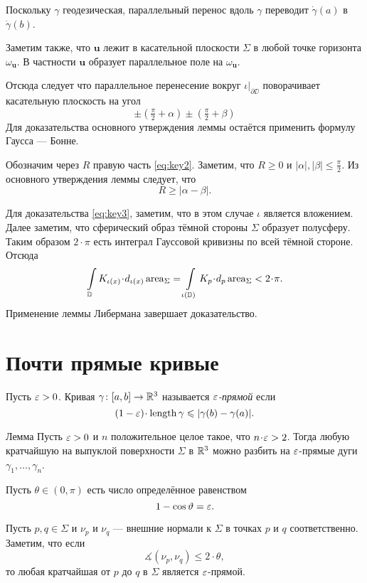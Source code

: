 \documentclass[a4paper,10pt]{article}
\begin{document}
Поскольку $\gamma$ геодезическая, 
параллельный перенос вдоль $\gamma$ 
переводит $\dot\gamma(a)$ в $\dot\gamma(b)$.

Заметим также, что $\bm{u}$ лежит в касательной плоскости $\Sigma$ в любой точке горизонта $\omega_{\bm{u}}$.
В частности $\bm{u}$ образует параллельное поле на $\omega_{\bm{u}}$.

Отсюда следует что параллельное перенесение вокруг $\iota|_{\partial\DD}$ 
поворачивает касательную плоскость на угол 
\[\pm(\tfrac\pi2+\alpha)\pm(\tfrac\pi2+\beta)\]
Для доказательства основного утверждения леммы остаётся применить формулу Гаусса --- Бонне.

Обозначим через $R$ правую часть \ref{eq:key2}.
Заметим, что $R\ge 0$ 
и $|\alpha|,|\beta|\le \tfrac\pi2$.
Из основного утверждения леммы следует, что  
\[R\ge\bigl|\alpha-\beta\bigr|.\]

Для доказательства \ref{eq:key3}, заметим, что в этом случае $\iota$ является вложением.
Далее заметим, что сферический образ тёмной стороны $\Sigma$ образует полусферу.
Таким образом $2\cdot\pi$ есть интеграл Гауссовой кривизны по всей тёмной стороне.
Отсюда
\[\int\limits_{\DD} K_{\iota(x)}\cdot d_{\iota(x)}\area_\Sigma
=
\int\limits_{\iota(\DD)} K_p\cdot d_p\area_\Sigma
<2\cdot\pi.\]
Применение леммы Либермана завершает доказательство.
\qeds

\section{Почти прямые кривые}

Пусть $\varepsilon>0$.
Кривая $\gamma\colon[a,b]\to\mathbb{R}^3$ называется \emph{$\varepsilon$-прямой}
если
\[(1-\eps)\cdot\length \gamma\le |\gamma(b)-\gamma(a)|.\]

\begin{thm}{Лемма}\label{lem:eps-straight}
Пусть $\varepsilon>0$ 
и $n$ положительное целое такое, что 
$n\cdot\eps>2$.
Тогда любую кратчайшую на выпуклой поверхности $\Sigma$ в $\mathbb{R}^3$
можно разбить на $\varepsilon$-прямые дуги $\gamma_1,\dots,\gamma_n$.
\end{thm}

Пусть $\theta\in(0,\pi)$
есть число определённое равенством
\[1-\cos\vartheta=\varepsilon.\]

Пусть $p,q\in \Sigma$ и $\nu_p$ и $\nu_q$ --- внешние нормали к $\Sigma$ в точках $p$ и $q$ соответственно.
Заметим, что если 
\[\measuredangle(\nu_p,\nu_q)\le 2\cdot\theta,\]
то любая кратчайшая от $p$ до $q$ в $\Sigma$
является $\varepsilon$-прямой.
\end{document}
